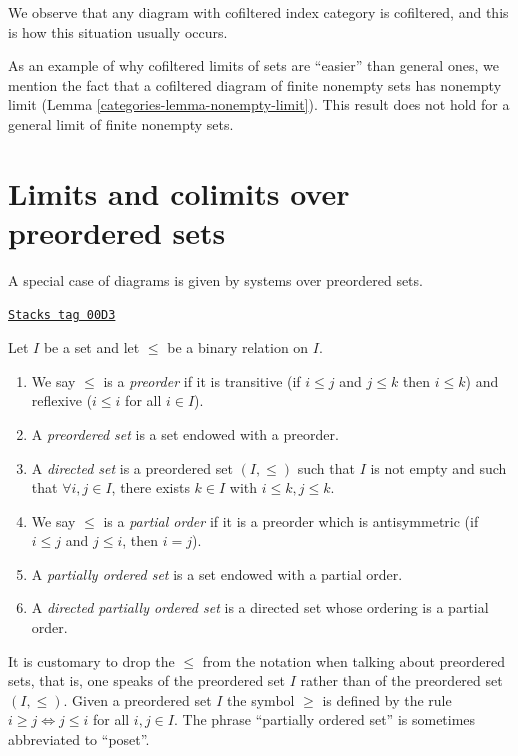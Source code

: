 We observe that any diagram with cofiltered index category is cofiltered,
and this is how this situation usually occurs.

\medskip\noindent
As an example of why cofiltered limits of sets are ``easier'' than
general ones, we mention the fact that a cofiltered diagram of finite
nonempty sets has nonempty limit (Lemma \ref{categories-lemma-nonempty-limit}).
This result does not hold for a general limit of finite
nonempty sets.

\section{Limits and colimits over preordered sets}
\label{categories-section-posets-limits}
A special case of diagrams is given by systems over preordered sets.

\begin{definition}
\label{categories-definition-directed-set}
\href{https://stacks.math.columbia.edu/tag/00D3}{\texttt{Stacks tag 00D3}}

Let $I$ be a set and let $\leq$ be a binary relation on $I$.
\begin{enumerate}
\item We say $\leq$ is a {\it preorder} if it is
transitive (if $i \leq j$ and $j \leq k$ then $i \leq k$) and
reflexive ($i \leq i$ for all $i \in I$).
\item A {\it preordered set} is a set endowed with a preorder.
\item A {\it directed set} is a preordered set $(I, \leq)$
such that $I$ is not empty and such that $\forall i, j \in I$,
there exists $k \in I$ with $i \leq k, j \leq k$.
\item We say $\leq$ is a {\it partial order} if it is a preorder
which is antisymmetric (if $i \leq j$ and $j \leq i$, then $i = j$).
\item A {\it partially ordered set} is a set endowed with a partial order.
\item A {\it directed partially ordered set} is a directed set
whose ordering is a partial order.
\end{enumerate}
\end{definition}

It is customary to drop the $\leq$ from the notation when talking
about preordered sets, that is, one speaks of
the preordered set $I$ rather than of the preordered set $(I, \leq)$.
Given a preordered set $I$ the symbol $\geq$ is defined by
the rule $i \geq j \Leftrightarrow j \leq i$ for all $i, j \in I$.
The phrase ``partially ordered set'' is sometimes abbreviated to ``poset''.

